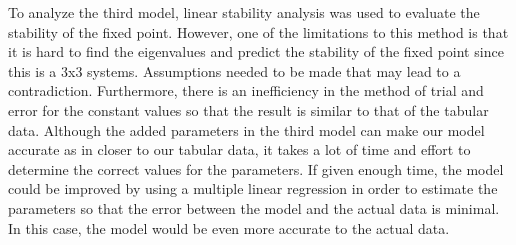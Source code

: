 \documentclass[a4paper, final, 12pt]{article}
\numberwithin{equation}{section}
\begin{document}
To analyze the third model, linear stability analysis was used to evaluate the stability of the fixed point. However, one of the limitations to this method is that it is hard to find the eigenvalues and predict the stability of the fixed point since this is a 3x3 systems. Assumptions needed to be made that may lead to a contradiction. Furthermore, there is an inefficiency in the method of trial and error for the constant values so that the result is similar to that of the tabular data. Although the added parameters in the third model can make our model accurate as in closer to our tabular data, it takes a lot of time and effort to determine the correct values for the parameters. If given enough time, the model could be improved by using a multiple linear regression in order to estimate the parameters so that the error between the model and the actual data is minimal. In this case, the model would be even more accurate to the actual data.\\
\end{document}
